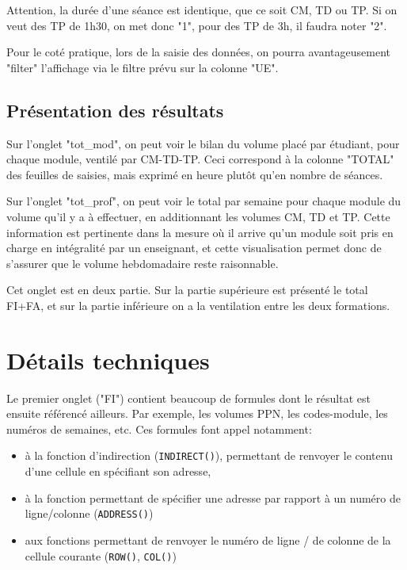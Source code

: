 \documentclass[12pt,a4paper]{article}
\begin{document}
Attention, la durée d'une séance est identique, que ce soit CM, TD ou TP.
Si on veut des TP de 1h30, on met donc "1", pour des TP de 3h, il faudra noter "2".

Pour le coté pratique, lors de la saisie des données, on pourra avantageusement "filter" l'affichage via le filtre prévu sur la colonne "UE".

\subsection{Présentation des résultats}

Sur l'onglet "tot\_mod", on peut voir le bilan du volume placé par étudiant, pour chaque module, ventilé par CM-TD-TP.
Ceci correspond à la colonne "TOTAL" des feuilles de saisies, mais exprimé en heure plutôt qu'en nombre de séances.

Sur l'onglet "tot\_prof", on peut voir le total par semaine pour chaque module du volume qu'il y a à effectuer, en additionnant les volumes CM, TD et TP.
Cette information est pertinente dans la mesure où il arrive qu'un module soit pris en charge en intégralité par un enseignant, et cette visualisation permet donc de s'assurer que le volume hebdomadaire reste raisonnable.

Cet onglet est en deux partie.
Sur la partie supérieure est présenté le total FI+FA,
et sur la partie inférieure on a la ventilation entre les deux formations.


\section{Détails techniques}

Le premier onglet ("FI") contient beaucoup de formules dont le résultat est ensuite référencé ailleurs.
Par exemple, les volumes PPN, les codes-module, les numéros de semaines, etc.
Ces formules font appel notamment:
\begin{itemize}
\item à la fonction d'indirection ({\tt INDIRECT()}), permettant de renvoyer le contenu d'une cellule en spécifiant son adresse, 
\item à la fonction permettant de spécifier une adresse par rapport à un numéro de ligne/colonne ({\tt ADDRESS()})
\item aux fonctions permettant de renvoyer le numéro de ligne / de colonne de la cellule courante ({\tt ROW()}, {\tt COL()})

\end{itemize}
\end{document}
